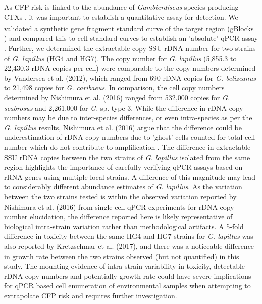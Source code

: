 \documentclass[10pt,letterpaper]{article}
\begin{document}
As CFP risk is linked to the abundance of \emph{Gambierdiscus} species producing CTXs \cite{globalcig,berdalet2012global}, it was important to establish a quantitative assay for detection.
We validated a synthetic gene fragment standard curve of the target region (gBlocks \textsuperscript{\textregistered}) and compared this to cell standard curves to establish an 'absolute' qPCR assay \citep{nishimura2016quantitative,hariganeya2013quantitative}. 
Further, we determined the extractable copy SSU rDNA number for two strains of \emph{G. lapillus} (HG4 and HG7). 
The copy number for \emph{G. lapillus} (5,855.3 to 22,430.3 rDNA copies per cell) were comparable to the copy numbers determined by Vandersea et al. (2012), which ranged from 690 rDNA copies for \emph{G. belizeanus} to 21,498 copies for \emph{G. caribaeus}. 
In comparison, the cell copy numbers determined by Nishimura et al. (2016) ranged from 532,000 copies for \emph{G. scabrosus} and 2,261,000 for \emph{G.} sp. type 3. While the difference in rDNA copy numbers may be due to inter-species differences, or even intra-species as per the \emph{G. lapillus} results, Nishimura et al. (2016) argue that the difference could be underestimation of rDNA copy numbers due to 'ghost' cells counted for total cell number which do not contribute to amplification \citep{nishimura2016quantitative,hariganeya2013quantitative}.
The difference in extractable SSU rDNA copies between the two strains of \emph{G. lapillus} isolated from the same region highlights the importance of carefully verifying qPCR assays based on rRNA genes using multiple local strains.  
A difference of this magnitude may lead to considerably different abundance estimates of \textit{G. lapillus}. 
As the variation between the two strains tested is within the observed variation reported by Nishimura et al. (2016) from single cell qPCR experiments for rDNA copy number elucidation, the difference reported here is likely representative of biological intra-strain variation rather than methodological artifacts. 
A 5-fold difference in toxicity between the same HG4 and HG7 strains for \emph{G. lapillus} was also reported by Kretzschmar et al. (2017), and there was a noticeable difference in growth rate between the two strains observed (but not quantified) in this study. 
The mounting evidence of intra-strain variability in toxicity, detectable rDNA copy numbers and potentially growth rate could have severe implications for qPCR based cell enumeration of environmental samples when attempting to extrapolate CFP risk and requires further investigation.\\
\end{document}
